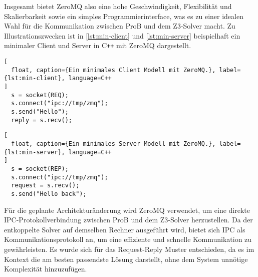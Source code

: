 Insgesamt bietet ZeroMQ also eine hohe Geschwindigkeit, Flexibilität und Skalierbarkeit sowie ein simples Programmierinterface,
was es zu einer idealen Wahl für die Kommunikation zwischen ProB und dem Z3-Solver macht.
Zu Illustrationszwecken ist in \cref{lst:min-client} und \cref{lst:min-server}  beispielhaft ein minimaler Client und Server in C\texttt{++} mit ZeroMQ dargestellt.

\begin{lstlisting}[
  float, caption={Ein minimales Client Modell mit ZeroMQ.}, label={lst:min-client}, language=C++
]
  s = socket(REQ);
  s.connect("ipc://tmp/zmq");
  s.send("Hello");
  reply = s.recv();
\end{lstlisting}

\begin{lstlisting}[
  float, caption={Ein minimales Server Modell mit ZeroMQ.}, label={lst:min-server}, language=C++
]
  s = socket(REP);
  s.connect("ipc://tmp/zmq");
  request = s.recv();
  s.send("Hello back");
\end{lstlisting}
\FloatBarrier

Für die geplante Architekturänderung wird ZeroMQ verwendet, um eine direkte IPC-Protokollverbindung zwischen ProB und dem Z3-Solver herzustellen.
Da der entkoppelte Solver auf demselben Rechner ausgeführt wird, bietet sich IPC als Kommunikationsprotokoll an, um eine effiziente und schnelle Kommunikation zu gewährleisten.
Es wurde sich für das Request-Reply Muster entschieden, da es im Kontext die am besten passendste Lösung darstellt,
ohne dem System unnötige Komplexität hinzuzufügen.
